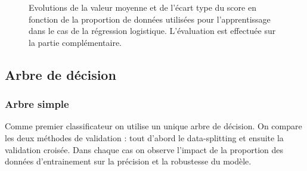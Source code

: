 \documentclass[11pt,a4paper]{article}
\begin{document}
		\begin{center}
			\begin{figure}
				\caption{Evolutions de la valeur moyenne et de l'écart type du score en fonction de la proportion de données utilisées pour l'apprentissage dans le cas de la régression logistique. L'évaluation est effectuée sur la partie complémentaire.\label{logreg_meanstd}}
			\end{figure}
		\end{center}

	\subsection{Arbre de décision}

		\subsubsection{Arbre simple}
			Comme premier classificateur on utilise un unique arbre de décision. On compare les deux méthodes de validation : tout d'abord le data-splitting et ensuite la validation croisée. Dans chaque cas on observe l'impact de la proportion des données d'entrainement sur la précision et la robustesse du modèle.
\end{document}
